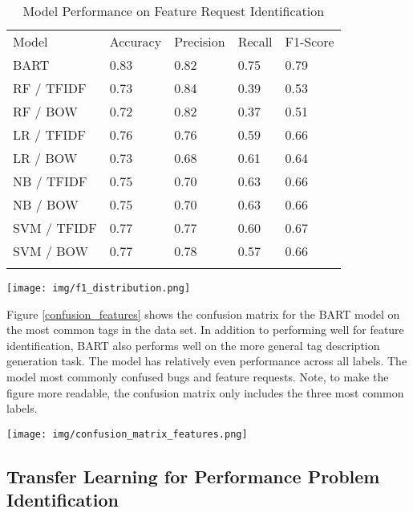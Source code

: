 \begin{table}
\caption{Model Performance on Feature Request Identification}
\label{feature_request_results}
\begin{tabular}{lllll}
\hline\noalign{\smallskip}
Model & Accuracy & Precision & Recall & F1-Score  \\
\noalign{\smallskip}\hline\noalign{\smallskip}
BART & 0.83 & 0.82 & 0.75 & 0.79 \\
RF / TFIDF  & 0.73 & 0.84 & 0.39 & 0.53 \\
RF / BOW  & 0.72 & 0.82 & 0.37 & 0.51 \\
LR / TFIDF & 0.76 & 0.76 & 0.59 & 0.66 \\
LR / BOW & 0.73 & 0.68 & 0.61 & 0.64 \\
NB / TFIDF & 0.75 & 0.70 & 0.63 & 0.66 \\
NB / BOW & 0.75 &  0.70 & 0.63 & 0.66 \\
SVM / TFIDF & 0.77 & 0.77 & 0.60 & 0.67 \\
SVM / BOW & 0.77 & 0.78 & 0.57 & 0.66 \\
\noalign{\smallskip}\hline
\end{tabular}
\end{table}

\begin{figure*}
  \texttt{[image: img/f1\_distribution.png]}
\caption{Distribution of F1 scores for the feature request identification task.}
\label{f1_distribution}
\end{figure*}

Figure \ref{confusion_features} shows the confusion matrix for the BART model on the most common tags in the data set. In addition to performing well for feature identification, BART also performs well on the more general tag description generation task. The model has relatively even performance across all labels. The model most commonly confused bugs and feature requests. Note, to make the figure more readable, the confusion matrix only includes the three most common labels.

\begin{figure*}
  \texttt{[image: img/confusion\_matrix\_features.png]}
\caption{BART confusion matrix for feature request identification.}
\label{confusion_features}
\end{figure*}

\subsection{Transfer Learning for Performance Problem Identification}

